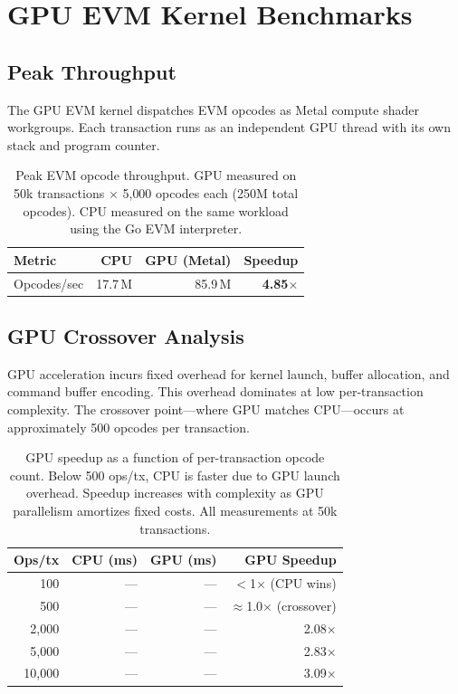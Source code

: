 \section{GPU EVM Kernel Benchmarks}


\subsection{Peak Throughput}

The GPU EVM kernel dispatches EVM opcodes as Metal compute shader workgroups. Each
transaction runs as an independent GPU thread with its own stack and program counter.

\begin{table}[h]
\centering
\small
\begin{tabular}{lrrr}
\toprule
\textbf{Metric} & \textbf{CPU} & \textbf{GPU (Metal)} & \textbf{Speedup} \\
\midrule
Opcodes/sec & 17.7\,M & 85.9\,M & \textbf{4.85$\times$} \\
\bottomrule
\end{tabular}
\caption{Peak EVM opcode throughput. GPU measured on 50k transactions $\times$
5{,}000 opcodes each (250M total opcodes). CPU measured on the same workload
using the Go EVM interpreter.}
\label{tab:peak}
\end{table}

\subsection{GPU Crossover Analysis}

GPU acceleration incurs fixed overhead for kernel launch, buffer allocation, and command
buffer encoding. This overhead dominates at low per-transaction complexity. The crossover
point---where GPU matches CPU---occurs at approximately 500 opcodes per transaction.

\begin{table}[h]
\centering
\small
\begin{tabular}{rrrr}
\toprule
\textbf{Ops/tx} & \textbf{CPU (ms)} & \textbf{GPU (ms)} & \textbf{GPU Speedup} \\
\midrule
100    & ---  & ---  & $<$1$\times$ (CPU wins) \\
500    & ---  & ---  & $\approx$1.0$\times$ (crossover) \\
2{,}000  & ---  & ---  & 2.08$\times$ \\
5{,}000  & ---  & ---  & 2.83$\times$ \\
10{,}000 & ---  & ---  & 3.09$\times$ \\
\bottomrule
\end{tabular}
\caption{GPU speedup as a function of per-transaction opcode count. Below 500 ops/tx,
CPU is faster due to GPU launch overhead. Speedup increases with complexity as GPU
parallelism amortizes fixed costs. All measurements at 50k transactions.}
\label{tab:crossover}
\end{table}

